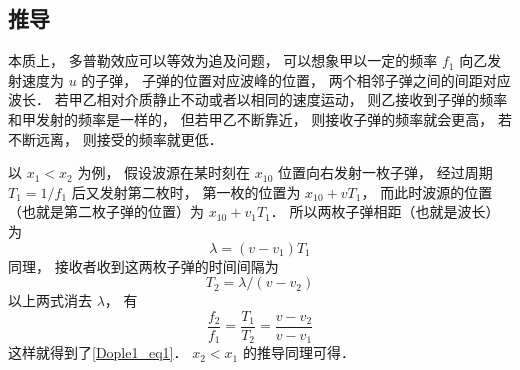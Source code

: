 \subsection{推导}
本质上， 多普勒效应可以等效为追及问题， 可以想象甲以一定的频率 $f_1$ 向乙发射速度为 $u$ 的子弹， 子弹的位置对应波峰的位置， 两个相邻子弹之间的间距对应波长． 若甲乙相对介质静止不动或者以相同的速度运动， 则乙接收到子弹的频率和甲发射的频率是一样的， 但若甲乙不断靠近， 则接收子弹的频率就会更高， 若不断远离， 则接受的频率就更低．

以 $x_1 < x_2$ 为例， 假设波源在某时刻在 $x_{10}$ 位置向右发射一枚子弹， 经过周期 $T_1 = 1/f_1$ 后又发射第二枚时， 第一枚的位置为 $x_{10} + vT_1$， 而此时波源的位置（也就是第二枚子弹的位置）为 $x_{10} + v_1 T_1$． 所以两枚子弹相距（也就是波长）为
\begin{equation}
\lambda = (v - v_1)T_1
\end{equation}
同理， 接收者收到这两枚子弹的时间间隔为
\begin{equation}
T_2 = \lambda/ (v - v_2)
\end{equation}
以上两式消去 $\lambda$， 有
\begin{equation}
\frac{f_2}{f_1} = \frac{T_1}{T_2} = \frac{v - v_2}{v - v_1}
\end{equation}
这样就得到了\autoref{Dople1_eq1}． $x_2 < x_1$ 的推导同理可得．
